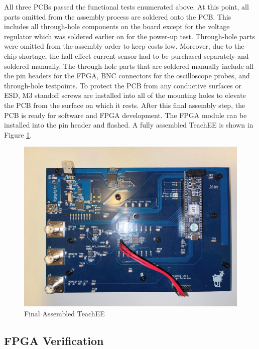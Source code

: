 \documentclass[letterpaper,11pt]{article}
\begin{document}
All three PCBs passed the functional tests enumerated above. At this point, all
parts omitted from the assembly process are soldered onto the PCB. This includes
all through-hole components on the board except for the voltage regulator which
was soldered earlier on for the power-up test. Through-hole parts were omitted
from the assembly order to keep costs low. Moreover, due to the chip shortage,
the hall effect current sensor had to be purchased separately and soldered
manually. The through-hole parts that are soldered manually include all the pin
headers for the FPGA, BNC connectors for the oscilloscope probes, and
through-hole testpoints. To protect the PCB from any conductive surfaces or ESD,
M3 standoff screws are installed into all of the mounting holes to elevate the
PCB from the surface on which it rests. After this final assembly step, the PCB
is ready for software and FPGA development. The FPGA module can be installed
into the pin header and flashed. A fully assembled TeachEE is shown in Figure
\ref{fig:pcb-final}.

\begin{figure}[H]
  \centering
  \includegraphics[width=\textwidth]{figures/pcb-final.jpg}
  \caption{Final Assembled TeachEE}
  \label{fig:pcb-final}
\end{figure}

\subsection{FPGA Verification} %

\end{document}
